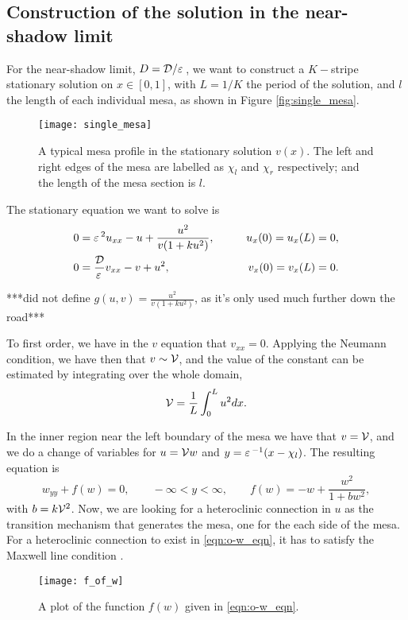 \subsection{Construction of the solution in the near-shadow limit}

For the near-shadow limit, $D=\mathcal{D}/\varepsilon\,$, we want to construct a $K-$stripe stationary solution on $x\in[0,1]$, with $L=1/K$ the period of the solution, and $l$ the length of each individual mesa, as shown in Figure \eqref{fig:single_mesa}.
% 
\begin{figure}[htb]
\begin{center}
\texttt{[image: single\_mesa]}
\caption{A typical mesa profile in the stationary solution $v(x)$. The left and right edges of the mesa are labelled as $\chi_l$ and $\chi_r$ respectively; and the length of the mesa section is $l$.}
\label{fig:single_mesa}
\end{center}
\end{figure}
% 
The stationary equation we want to solve is
% 
\begin{equation}
\label{eqn:o-gms_stat}
\begin{split}
\begin{aligned}
	0 &= \varepsilon\,^2 u_{xx} -u + \frac{u^2}{v(1+ku^2)},\qquad &u_x(0)=u_x(L)=0, \\
	0 &= \frac{\mathcal{D}}{\varepsilon\,}v_{xx} - v + u^2,\qquad &v_x(0)=v_x(L)=0.
\end{aligned}
\end{split}
\end{equation}
% 

***did not define $g(u,v)=\frac{u^2}{v(1+ku^2)}$, as it's only used much further down the road***

To first order, we have in the $v$ equation that $v_{xx}=0$. Applying the Neumann condition, we have then that $v\sim\mathcal{V}$, and the value of the constant can be estimated by integrating over the whole domain,
% 
\begin{equation}
\label{eqn:o-v_first_order}
  \mathcal{V} = \frac{1}{L}\int_0^Lu^2dx.
\end{equation}
% 

In the inner region near the left boundary of the mesa we have that $v=\mathcal{V}$, and we do a change of variables for $u=\mathcal{V} w$ and $y=\varepsilon\,^{-1}(x-\chi_l)$. The resulting equation is
% 
\begin{equation}
\label{eqn:o-w_eqn}
  w_{yy}+f(w)=0, \qquad -\infty<y<\infty,\qquad f(w) = -w + \frac{w^2}{1+bw^2},
\end{equation}
% 
with $b = k\mathcal{V}^2$. Now, we are looking for a heteroclinic connection in $u$ as the transition mechanism that generates the mesa, one for the each side of the mesa. For a heteroclinic connection to exist in \eqref{eqn:o-w_eqn}, it has to satisfy the Maxwell line condition \cite{maxwell1994}.
% 
\begin{figure}[htb]
\begin{center}
\texttt{[image: f\_of\_w]}
\caption{A plot of the function $f(w)$ given in \eqref{eqn:o-w_eqn}.}
\label{fig:f(w)}
\end{center}
\end{figure}
% 

